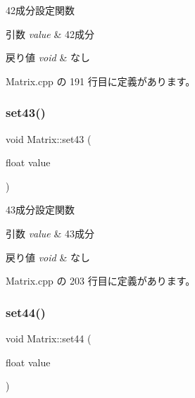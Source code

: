 42成分設定関数 


\begin{DoxyParams}{引数}
{\em value} & 42成分 \\
\hline
\end{DoxyParams}

\begin{DoxyRetVals}{戻り値}
{\em void} & なし \\
\hline
\end{DoxyRetVals}


 Matrix.\+cpp の 191 行目に定義があります。

\mbox{\label{class_matrix_a724ee3aa5cfc17cea02fe474d807c0cc}} 
\subsubsection{\texorpdfstring{set43()}{set43()}}
{\footnotesize\ttfamily void Matrix\+::set43 (\begin{DoxyParamCaption}\item[{float}]{value }\end{DoxyParamCaption})}



43成分設定関数 


\begin{DoxyParams}{引数}
{\em value} & 43成分 \\
\hline
\end{DoxyParams}

\begin{DoxyRetVals}{戻り値}
{\em void} & なし \\
\hline
\end{DoxyRetVals}


 Matrix.\+cpp の 203 行目に定義があります。

\mbox{\label{class_matrix_a1cea9dbd57d0ad3583243af3559917ad}} 
\subsubsection{\texorpdfstring{set44()}{set44()}}
{\footnotesize\ttfamily void Matrix\+::set44 (\begin{DoxyParamCaption}\item[{float}]{value }\end{DoxyParamCaption})}



